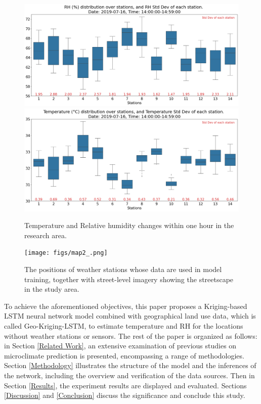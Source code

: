 \documentclass[a4paper,fleqn]{cas-sc}
\begin{document}
\begin{figure}[!h]
	\centering
        	\includegraphics[scale=0.38]{figs/new_figs/RH14pm.png}
	    \includegraphics[scale=0.38]{figs/new_figs/tem14pm.png}
	\caption{Temperature and Relative humidity changes within one hour in the research area.}
	\label{FIG:weatherData14pm}
\end{figure}

\begin{figure}[!h]
	\centering
	\texttt{[image: figs/map2\_.png]}
	\caption{The positions of weather stations whose data are used in model training, together with street-level imagery showing the streetscape in the study area.}
	\label{FIG:map}
\end{figure}

To achieve the aforementioned objectives, this paper proposes a Kriging-based LSTM neural network model combined with geographical land use data, which is called Geo-Kriging-LSTM, to estimate temperature and RH for the locations without weather stations or sensors. 
The rest of the paper is organized as follows: in Section \ref{Related Work}, an extensive examination of previous studies on microclimate prediction is presented, encompassing a range of methodologies. Section \ref{Methodology} illustrates the structure of the model and the inferences of the network, including the overview and verification of the data sources. Then in Section \ref{Results}, the experiment results are displayed and evaluated. Sections \ref{Discussion} and \ref{Conclusion} discuss the significance and conclude this study.
\end{document}
